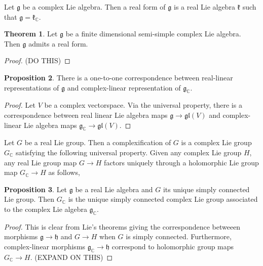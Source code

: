 \documentclass[12pt]{extarticle}
\theoremstyle{definition}
\newtheorem{theorem}{Theorem}[section]
\newtheorem{proposition}[theorem]{Proposition}
\newenvironment{definition}[1][Definition:]{\begin{trivlist}
\item[\hskip \labelsep {\bfseries #1}]}{\end{trivlist}}
\newcommand{\g}{\mathfrak{g}}
\newcommand{\h}{\mathfrak{h}}
\newcommand{\gl}[1]{\mathfrak{gl}\left(#1\right)}
\newcommand{\C}{\mathbb{C}}
\begin{document}
\begin{definition}
Let $\g$ be a complex Lie algebra. Then a real form of $\g$ is a real Lie algebra $\mathfrak{k}$ such that $\g = \mathfrak{k}_\C$.
\end{definition}

\begin{theorem}
Let $\g$ be a finite dimensional semi-simple complex Lie algebra. Then $\g$ admits a real form.
\end{theorem}

\begin{proof}
(DO THIS)
\end{proof}

\begin{proposition}
There is a one-to-one correspondence between real-linear representations of $\g$ and complex-linear representation of $\g_\C$.
\end{proposition}

\begin{proof}
Let $V$ be a complex vectorspace. Via the universal property, there is a correspondence between real linear Lie algebra maps $\g \to \gl{V}$ and complex-linear Lie algebra maps $\g_\C \to \gl{V}$. 
\end{proof}

\begin{definition}
Let $G$ be a real Lie group. Then a complexification of $G$ is a complex Lie group $G_\C$ satisfying the following universal property. Given any complex Lie group $H$, any real Lie group map $G \to H$ factors uniquely through a holomorphic Lie group map $G_\C \to H$ as follows,
\begin{center}
\end{center}
\end{definition}

\begin{proposition}
Let $\g$ be a real Lie algebra and $G$ its unique simply connected Lie group. Then $G_\C$ is the unique  simply connected complex Lie group associated to the complex Lie algebra $\g_\C$. 
\end{proposition}

\begin{proof}
This is clear from Lie's theorems giving the correspondence betweeen morphisms $\g \to \h$ and $G \to H$ when $G$ is simply connected. Furthermore, complex-linear morphisms $\g_\C \to \h$ correspond to holomorphic group maps $G_\C \to H$. (EXPAND ON THIS)
\end{proof}
\end{document}
